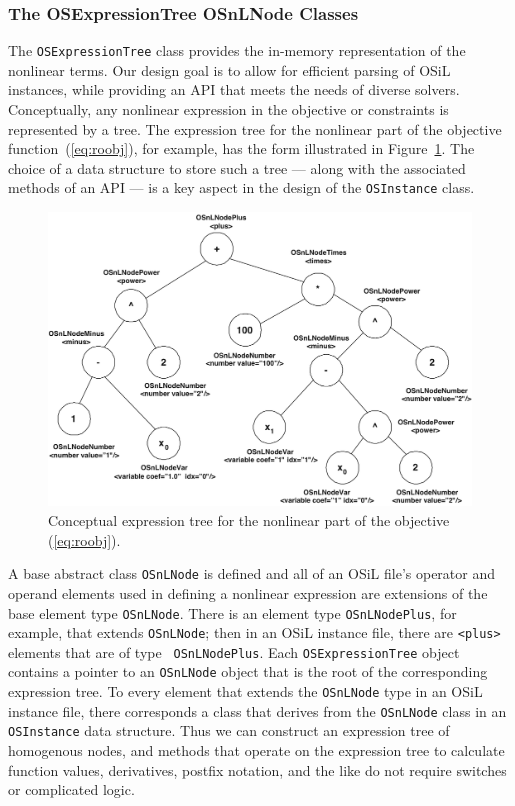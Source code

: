 \documentclass[11pt]{article}
\newcommand{\figurepath}{./figures}
\newcounter{Fig}
\renewcommand{\_}{{\char"5F}}
\renewcommand{\{}{{\char"7B}}
\renewcommand{\}}{{\char"7D}}
\renewcommand{\^}{{\char"0D}}
\renewcommand{\'}{{\char"0D}}
\begin{document}
\begin{enumerate}[Step 1:]
\subsubsection{The OSExpressionTree OSnLNode Classes}\label{section:osexpressiontreeclass}

The {\tt OSExpressionTree} class provides the in-memory representation
of the nonlinear terms.  Our design goal is  to allow for efficient parsing of OSiL instances,
while providing an API that meets the needs of diverse solvers.  Conceptually, any nonlinear expression in the
objective or constraints is represented by a tree.  The expression tree for the nonlinear part of the
objective function~(\ref{eq:roobj}), for example, has the form illustrated in Figure~\ref{figure:expressiontree}.
The choice of a data structure to store such a tree --- along with the associated methods of an API --- is a key aspect
in the design of the {\tt OSInstance} class.

\begin{figure}[ht]
\centering
\includegraphics[scale=0.38]{./figures/expressiontree.png}
\caption{Conceptual expression tree for the nonlinear part of the objective (\ref{eq:roobj}).} \label{figure:expressiontree}
\end{figure}


A base abstract class {\tt OSnLNode} is defined and  all of an OSiL file's
operator and operand elements used in defining a
nonlinear expression are extensions of the base element type {\tt OSnLNode}. There is an element type {\tt OSnLNodePlus}, for example, that
extends {\tt OSnLNode}; then in an OSiL instance
file, there are {\tt <plus>} elements that are of type {\tt
OSnLNodePlus}.   Each {\tt OSExpressionTree} object contains a pointer to an {\tt OSnLNode} object that is the root of the corresponding expression tree.  To every element that extends the {\tt OSnLNode} type in an OSiL instance file, there corresponds a class that derives from the {\tt OSnLNode} class in an {\tt OSInstance} data structure.  Thus we can construct an expression tree of homogenous nodes, and methods that operate on the expression tree to calculate function values, derivatives, postfix notation, and the like do not require switches or complicated logic.



\end{enumerate}
\end{document}
